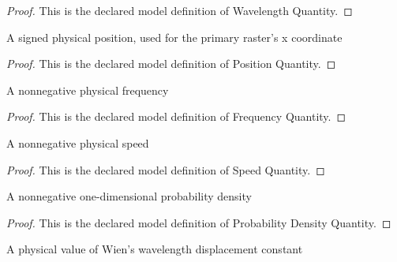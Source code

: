\begin{proof}
  This is the declared model definition of Wavelength Quantity.
\end{proof}
\begin{definition}
  \label{def:physics:phyx-mini-0646:phyxminiproblems-problemphyxmini0646-positionquantity}
  A signed physical position, used for the primary raster's x coordinate
\end{definition}
\begin{proof}
  This is the declared model definition of Position Quantity.
\end{proof}
\begin{definition}
  \label{def:physics:phyx-mini-0646:phyxminiproblems-problemphyxmini0646-frequencyquantity}
  A nonnegative physical frequency
\end{definition}
\begin{proof}
  This is the declared model definition of Frequency Quantity.
\end{proof}
\begin{definition}
  \label{def:physics:phyx-mini-0646:phyxminiproblems-problemphyxmini0646-speedquantity}
  A nonnegative physical speed
\end{definition}
\begin{proof}
  This is the declared model definition of Speed Quantity.
\end{proof}
\begin{definition}
  \label{def:physics:phyx-mini-0646:phyxminiproblems-problemphyxmini0646-probabilitydensityquantity}
  A nonnegative one-dimensional probability density
\end{definition}
\begin{proof}
  This is the declared model definition of Probability Density Quantity.
\end{proof}
\begin{definition}
  \label{def:physics:phyx-mini-0646:phyxminiproblems-problemphyxmini0646-wiendisplacementconstantquantity}
  A physical value of Wien's wavelength displacement constant
\end{definition}
